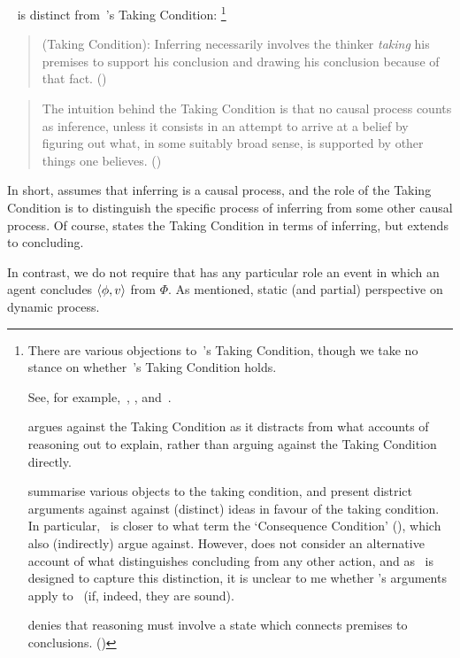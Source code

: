 \begin{note}
 ~\supportI{} is distinct from~\citeauthor{Boghossian:2014aa}'s Taking Condition:%
  \footnote{
    There are various objections to~\citeauthor{Boghossian:2014aa}'s Taking Condition, though we take no stance on whether~\citeauthor{Boghossian:2014aa}'s Taking Condition holds.

    See, for example,~\textcite{Hlobil:2014tq}, \textcite{McHugh:2016vp}, and~\textcite{Wright:2014tt}.

    \citeauthor{Hlobil:2014tq} argues against the Taking Condition as it distracts from what accounts of reasoning out to explain, rather than arguing against the Taking Condition directly.

    \citeauthor{McHugh:2016vp} summarise various objects to the taking condition, and present district arguments against against (distinct) ideas in favour of the taking condition.
    In particular,~\supportI{} is closer to what \citeauthor{McHugh:2016vp} term the `Consequence Condition' (\citeyear[cf.][316]{McHugh:2016vp}), which \citeauthor{McHugh:2016vp} also (indirectly) argue against.
    However, \citeauthor{McHugh:2016vp} does not consider an alternative account of what distinguishes concluding from any other action, and as~\supportI{} is designed to capture this distinction, it is unclear to me whether \citeauthor{McHugh:2016vp}'s arguments apply to~\supportI{} (if, indeed, they are sound).

    \citeauthor{Wright:2014tt} denies that reasoning must involve a state which connects premises to conclusions. (\citeyear[Cf.][33-34]{Wright:2014tt})
  }

  \begin{quote}
    (Taking Condition):
    Inferring necessarily involves the thinker \emph{taking} his premises to support his conclusion and drawing his conclusion because of that fact.%
    \mbox{}\hfill\mbox{(\citeyear[5]{Boghossian:2014aa})}
  \end{quote}

  \begin{quote}
    The intuition behind the Taking Condition is that no causal process counts as inference, unless it consists in an attempt to arrive at a belief by figuring out what, in some suitably broad sense, is supported by other things one believes.%
    \mbox{}\hfill\mbox{(\citeyear[5]{Boghossian:2014aa})}
  \end{quote}

  In short, \citeauthor{Boghossian:2014aa} assumes that inferring is a causal process, and the role of the Taking Condition is to distinguish the specific process of inferring from some other causal process.
  Of course, \citeauthor{Boghossian:2014aa} states the Taking Condition in terms of inferring, but extends to concluding.

  In contrast, we do not require that \support{} has any particular role an event in which an agent concludes \(\langle \phi, v \rangle\) from \(\Phi\).
  As mentioned, static (and partial) perspective on dynamic process.
\end{note}

